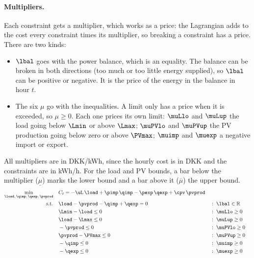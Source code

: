 \paragraph{Multipliers.}
Each constraint gets a multiplier, which works as a price: the Lagrangian adds to the cost
every constraint times its multiplier, so breaking a constraint has a price. There are two
kinds:
\begin{itemize}
    \item $\lbal$ goes with the power balance, which is an equality. The balance can be broken
    in both directions (too much or too little energy supplied), so $\lbal$ can be positive
    or negative. It is the price of the energy in the balance in hour $t$.
    \item The six $\mu$ go with the inequalities. A limit only has a price when it is
    exceeded, so $\mu \geq 0$. Each one prices its own limit: $\muLlo$ and $\muLup$ the load
    going below $\Lmin$ or above $\Lmax$; $\muPVlo$ and $\muPVup$ the PV production going
    below zero or above $\PVmax$; $\muimp$ and $\muexp$ a negative import or export.
\end{itemize}
All multipliers are in DKK/kWh, since the hourly cost is in DKK and the constraints are in
kWh/h. For the load and PV bounds, a bar below the multiplier ($\underline{\mu}$) marks the
lower bound and a bar above it ($\overline{\mu}$) the upper bound.
\begin{align}
    \min_{\load,\, \qimp,\, \qexp,\, \pvprod} \quad
    & C_t = -\uL \, \load + \pimp \, \qimp - \pexp \, \qexp + \cpv \, \pvprod \\
    \text{s.t.} \quad
    & \load - \pvprod - \qimp + \qexp = 0
        & & : \; \lbal \in \mathbb{R} \label{eq:b_balance} \\
    & \Lmin - \load \leq 0
        & & : \; \muLlo \geq 0 \label{eq:b_load_lo} \\
    & \load - \Lmax \leq 0
        & & : \; \muLup \geq 0 \label{eq:b_load_up} \\
    & -\pvprod \leq 0
        & & : \; \muPVlo \geq 0 \label{eq:b_pv_lo} \\
    & \pvprod - \PVmax \leq 0
        & & : \; \muPVup \geq 0 \label{eq:b_pv_up} \\
    & -\qimp \leq 0
        & & : \; \muimp \geq 0 \label{eq:b_imp} \\
    & -\qexp \leq 0
        & & : \; \muexp \geq 0 \label{eq:b_exp}
\end{align}

